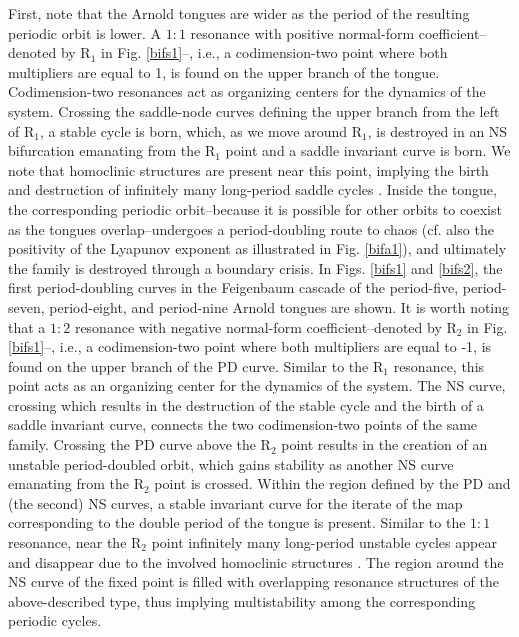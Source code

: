 \documentclass{article}
\theoremstyle{plain}
\theoremstyle{definition}
\begin{document}
First, note that the Arnold tongues are wider as the period of the resulting periodic orbit is lower. A $1:1$ resonance with positive normal-form coefficient--denoted by R$_1$ in Fig. \ref{bifs1}--, i.e., a codimension-two point where both multipliers are equal to 1, is found on the upper branch of the tongue. Codimension-two resonances act as organizing centers for the dynamics of the system. Crossing the saddle-node curves defining the upper branch from the left of R$_1$, a stable cycle is born, which, as we move around R$_1$, is destroyed in an NS bifurcation emanating from the R$_1$ point and a saddle invariant curve is born. We note that homoclinic structures are present near this point, implying the birth and destruction of infinitely many long-period saddle cycles \cite{kuznetsov1}. Inside the tongue, the corresponding periodic orbit--because it is possible for other orbits to coexist as the tongues overlap--undergoes a period-doubling route to chaos (cf. also the positivity of the Lyapunov exponent as illustrated in Fig. \ref{bifa1}), and ultimately the family is destroyed through a boundary crisis. In Figs. \ref{bifs1} and \ref{bifs2}, the first period-doubling curves in the Feigenbaum cascade of the period-five, period-seven, period-eight, and period-nine Arnold tongues are shown. It is worth noting that a $1:2$ resonance with negative normal-form coefficient--denoted by R$_2$ in Fig. \ref{bifs1}--, i.e., a codimension-two point where both multipliers are equal to -1, is found on the upper branch of the PD curve. Similar to the R$_1$ resonance, this point acts as an organizing center for the dynamics of the system. The NS curve, crossing which results in the destruction of the stable cycle and the birth of a saddle invariant curve, connects the two codimension-two points of the same family. Crossing the PD curve above the R$_2$ point results in the creation of an unstable period-doubled orbit, which gains stability as another NS curve emanating from the R$_2$ point is crossed. Within the region defined by the PD and (the second) NS curves, a stable invariant curve for the iterate of the map corresponding to the double period of the tongue is present. Similar to the $1:1$ resonance, near the R$_2$ point infinitely many long-period unstable cycles appear and disappear due to the involved homoclinic structures \cite{kuznetsov1}. The region around the NS curve of the fixed point is filled with overlapping resonance structures of the above-described type, thus implying multistability among the corresponding periodic cycles.
\end{document}
